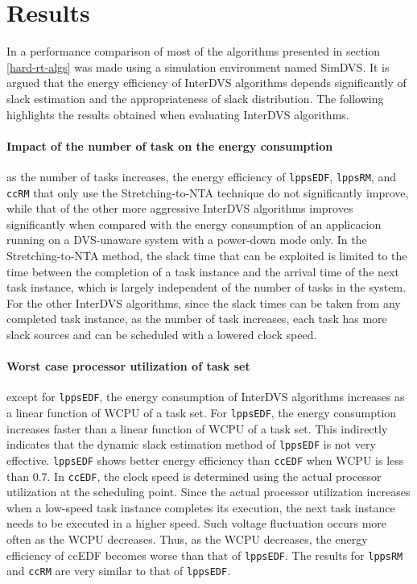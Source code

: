 \documentclass[10pt,article]{IEEEtran}
\begin{document}
\section{Results}
In \cite{kim-2} a performance comparison of most of the algorithms presented in section \ref{hard-rt-algs} was made using a simulation environment named SimDVS. It is argued that the energy efficiency of InterDVS algorithms depends significantly of slack estimation and the appropriateness of slack distribution. The following highlights the results obtained when evaluating InterDVS algorithms.

\paragraph{Impact of the number of task on the energy consumption} as the number of tasks increases,  the  energy  efficiency  of \texttt{lppsEDF}, \texttt{lppsRM}, and \texttt{ccRM} that only use the Stretching-to-NTA technique do not significantly improve, while that of the other more aggressive InterDVS algorithms improves significantly when compared with the energy consumption of an applicacion running on a DVS-unaware system with a power-down mode only. In the Stretching-to-NTA method, the slack time that can be exploited is limited to the time between the completion of a task instance and the arrival time of the next task instance, which is largely independent of the number of tasks in the system. For the other InterDVS algorithms, since the slack times can be taken from any completed task instance, as the number of task increases, each task has more slack sources and can be scheduled with a lowered clock speed.

\paragraph{Worst case processor utilization of task set} except for \texttt{lppsEDF}, the energy consumption of InterDVS algorithms increases as a linear function of WCPU of a task  set. For \texttt{lppsEDF}, the energy consumption increases faster than a linear function of WCPU of a task set. This indirectly indicates that the dynamic slack estimation method of \texttt{lppsEDF} is not very effective. 
\texttt{lppsEDF} shows better energy efficiency than \texttt{ccEDF} when WCPU is less than 0.7. In \texttt{ccEDF}, the clock speed is determined using the actual processor utilization at the scheduling point.  Since the actual processor utilization increases when a low-speed task instance completes its execution, the next task instance needs to be executed in a higher speed. Such  voltage fluctuation occurs more often as the WCPU decreases. Thus, as the WCPU decreases, the energy efficiency of ccEDF becomes worse than that of \texttt{lppsEDF}. The results for \texttt{lppsRM} and \texttt{ccRM} are very similar to that of \texttt{lppsEDF}. 
\end{document}
